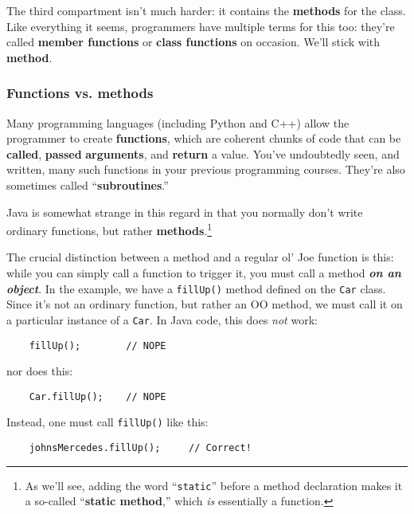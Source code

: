 The third compartment isn't much harder: it contains the \textbf{methods} for
the class. Like everything it seems, programmers have multiple terms for this
too: they're called \textbf{member functions} or \textbf{class functions} on
occasion. We'll stick with \textbf{method}.

\subsubsection{Functions vs. methods}

Many programming languages (including Python and C++) allow the programmer to
create \textbf{functions}, which are coherent chunks of code that can be
\textbf{called}, \textbf{passed} \textbf{arguments}, and \textbf{return} a
value. You've undoubtedly seen, and written, many such functions in your
previous programming courses. They're also sometimes called
``\textbf{subroutines}.''

Java is somewhat strange in this regard in that you normally don't write
ordinary functions, but rather \textbf{methods}.\footnote{As we'll see, adding
the word ``\texttt{static}'' before a method declaration makes it a so-called
``\textbf{static method},'' which \textit{is} essentially a function.}

The crucial distinction between a method and a regular ol' Joe function is
this: while you can simply call a function to trigger it, you must call a
method \textbf{\textit{on an object}}. In the example, we have a
\texttt{fillUp()} method defined on the \texttt{Car} class. Since it's not an
ordinary function, but rather an OO method, we must call it on a particular
instance of a \texttt{Car}. In Java code, this does \textit{not} work:

\label{callMethodOnObject}
\begin{verbatim}
    fillUp();        // NOPE
\end{verbatim}

nor does this:

\begin{verbatim}
    Car.fillUp();    // NOPE
\end{verbatim}

Instead, one must call \texttt{fillUp()} like this:

\begin{verbatim}
    johnsMercedes.fillUp();     // Correct!
\end{verbatim}

